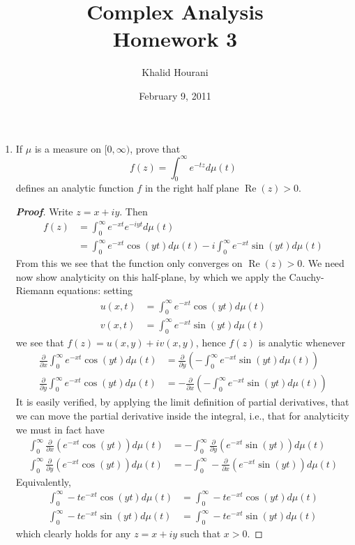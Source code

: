 \documentclass[12pt,leqno]{article}
\title{Complex Analysis\\\large Homework 3}
\date{February 9, 2011}
\author{Khalid Hourani}
\theoremstyle{definition}
\newcommand{\re}{\operatorname{Re}}
\newenvironment{Proof}{\begin{proof}[\textnormal{\textbf{Proof}}]}{\end{proof}}
\begin{document}
 \begin{titlepage}
  \maketitle
 \end{titlepage}
\clearpage\mbox{}\clearpage

\setcounter{page}{1}
\begin{enumerate}
 \item If $\mu$ is a measure on $[0,\infty)$, prove that \[f(z)=\int_0^{\infty}e^{-tz}d\mu(t)\] defines an analytic function $f$ in the right half plane $\re(z)>0$.
  \begin{Proof}
   Write $z=x+iy$. Then \begin{align*}f(z)&=\int_0^{\infty}e^{-xt}e^{-iyt}d\mu(t)\\&=\int_0^{\infty}e^{-xt}\cos(yt)d\mu(t)-i\int_0^{\infty}e^{-xt}\sin(yt)d\mu(t)\end{align*} From this we see that the function only converges on $\re(z)>0$. We need now show analyticity on this half-plane, by which we apply the Cauchy-Riemann equations: setting \begin{align*}u(x,t)&=\int_0^{\infty}e^{-xt}\cos(yt)d\mu(t)\\v(x,t)&=\int_0^{\infty}e^{-xt}\sin(yt)d\mu(t)\end{align*} we see that $f(z)=u(x,y)+iv(x,y)$, hence $f(z)$ is analytic whenever \begin{align*}\frac{\partial}{\partial x}\int_0^{\infty}e^{-xt}\cos(yt)d\mu(t)&=\frac{\partial}{\partial y}\left(-\int_0^{\infty}e^{-xt}\sin(yt)d\mu(t)\right)\\\frac{\partial}{\partial y}\int_0^{\infty}e^{-xt}\cos(yt)d\mu(t)&=-\frac{\partial}{\partial x}\left(-\int_0^{\infty}e^{-xt}\sin(yt)d\mu(t)\right)\end{align*} It is easily verified, by applying the limit definition of partial derivatives, that we can move the partial derivative inside the integral, i.e., that for analyticity we must in fact have \begin{align*}\int_0^{\infty}\frac{\partial}{\partial x}\left(e^{-xt}\cos(yt)\right)d\mu(t)&=-\int_0^{\infty}\frac{\partial}{\partial y}\left(e^{-xt}\sin(yt)\right)d\mu(t)\\\int_0^{\infty}\frac{\partial}{\partial y}\left(e^{-xt}\cos(yt)\right)d\mu(t)&=-\int_0^{\infty}-\frac{\partial}{\partial x}\left(e^{-xt}\sin(yt)\right)d\mu(t)\end{align*} Equivalently, \begin{align*}\int_0^{\infty}-te^{-xt}\cos(yt)d\mu(t)&=\int_0^{\infty}-te^{-xt}\cos(yt)d\mu(t)\\\int_0^{\infty}-te^{-xt}\sin(yt)d\mu(t)&=\int_0^{\infty}-te^{-xt}\sin(yt)d\mu(t)\end{align*} which clearly holds for any $z=x+iy$ such that $x>0$. 

\end{Proof}
\end{enumerate}
\end{document}
